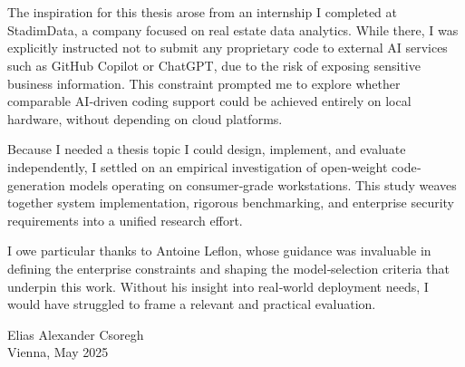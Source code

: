 \chapter*{}%
\label{ch:voorwoord}

The inspiration for this thesis arose from an internship I completed at StadimData, a company focused on real estate data analytics. While there, I was explicitly instructed not to submit any proprietary code to external AI services such as GitHub Copilot or ChatGPT, due to the risk of exposing sensitive business information. This constraint prompted me to explore whether comparable AI‐driven coding support could be achieved entirely on local hardware, without depending on cloud platforms.

Because I needed a thesis topic I could design, implement, and evaluate independently, I settled on an empirical investigation of open‐weight code‐generation models operating on consumer‐grade workstations. This study weaves together system implementation, rigorous benchmarking, and enterprise security requirements into a unified research effort.

I owe particular thanks to Antoine Leflon, whose guidance was invaluable in defining the enterprise constraints and shaping the model‐selection criteria that underpin this work. Without his insight into real‐world deployment needs, I would have struggled to frame a relevant and practical evaluation.

\noindent Elias Alexander Csoregh\\
Vienna, May 2025
